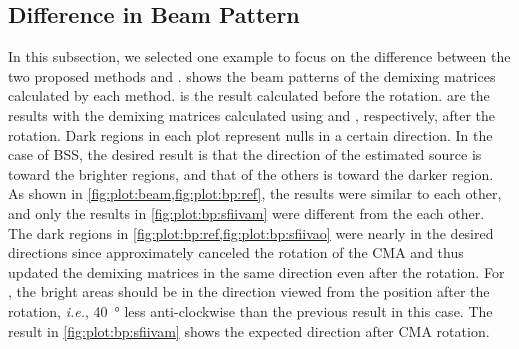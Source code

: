 \documentclass[sip,biber]{now-journal}
\begin{document}
\subsection{Difference in Beam Pattern}

In this subsection, we selected one example to focus on the difference between the two proposed methods \SFIIVAo{} and \SFIIVAm{}.
 shows the beam patterns of the demixing matrices calculated by each method.
 is the result calculated before the rotation.
 are the results with the demixing matrices calculated using \SFIIVAo{} and \SFIIVAm{}, respectively, after the rotation.
Dark regions in each plot represent nulls in a certain direction.
In the case of BSS, the desired result is that the direction of the estimated source is toward the brighter regions, and that of the others is toward the darker region.
As shown in \cref{fig:plot:beam,fig:plot:bp:ref}, the results were similar to each other, and only the results in \cref{fig:plot:bp:sfiivam} were different from the each other.
The dark regions in \cref{fig:plot:bp:ref,fig:plot:bp:sfiivao} were nearly in the desired directions since \SFIIVAo{} approximately canceled the rotation of the CMA and thus updated the demixing matrices in the same direction even after the rotation.
For \SFIIVAm{}, the bright areas should be in the direction viewed from the position after the rotation, \emph{i.e.}, \SI{40}{\degree} less anti-clockwise than the previous result in this case.
The result in \cref{fig:plot:bp:sfiivam} shows the expected direction after CMA rotation.
\end{document}
